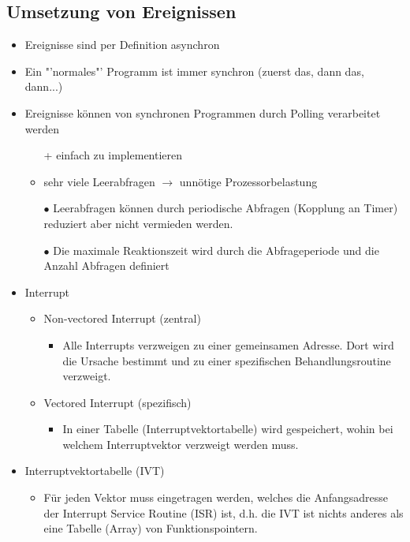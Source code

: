 \subsection{Umsetzung von Ereignissen}
\begin{itemize}
	\item Ereignisse sind per Definition asynchron
	\item Ein "'normales"' Programm ist immer synchron (zuerst das, dann das, dann...)
	\item Ereignisse können von synchronen Programmen durch Polling verarbeitet werden
	\begin{itemize}
		\item[+] einfach zu implementieren
		\item sehr viele Leerabfragen $\rightarrow$ unnötige Prozessorbelastung
		\item[$\bullet$] Leerabfragen können durch periodische Abfragen (Kopplung an Timer) reduziert aber nicht vermieden werden.
		\item[$\bullet$] Die maximale Reaktionszeit wird durch die Abfrageperiode und die Anzahl Abfragen definiert
	\end{itemize}
	\item Interrupt
	\begin{itemize}
		\item Non-vectored Interrupt (zentral)
		\begin{itemize}
			\item Alle Interrupts verzweigen zu einer gemeinsamen Adresse. Dort wird die Ursache bestimmt und zu einer spezifischen Behandlungsroutine verzweigt.
		\end{itemize}
		\item Vectored Interrupt (spezifisch)
		\begin{itemize}
			\item In einer Tabelle (Interruptvektortabelle) wird gespeichert, wohin bei welchem Interruptvektor verzweigt werden muss.
		\end{itemize}
	\end{itemize}
	\item	Interruptvektortabelle (IVT)
	\begin{itemize}
		\item Für jeden Vektor muss eingetragen werden, welches die Anfangsadresse der Interrupt Service Routine (ISR) ist, d.h. die IVT ist nichts anderes als eine Tabelle (Array) von Funktionspointern.
	\end{itemize}
\end{itemize}

